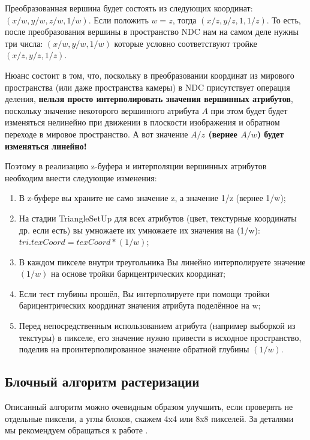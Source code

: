 \documentclass[12pt,subf,href,colorlinks=true]{article}
\begin{document}
Преобразованная вершина будет состоять из следующих координат: $(x/w, y/w, z/w, 1/w)$. Если положить $w=z$, тогда $(x/z, y/z, 1, 1/z)$. То есть, после преобразования вершины в пространство NDC нам на самом деле нужны три числа: $(x/w, y/w, 1/w)$ которые условно соответствуют тройке $(x/z, y/z, 1/z)$.

Нюанс состоит в том, что, поскольку в преобразовании координат из мирового пространства (или даже пространства камеры) в NDC присутствует операция деления, \textbf{нельзя просто интерполировать значения вершинных атрибутов}, поскольку значение некоторого вершинного атрибута $A$ при этом будет будет изменяться нелинейно при движении в плоскости изображения и обратном переходе в мировое пространство. А вот значение \textbf{$A/z$ (вернее $A/w$) будет изменяться линейно!}

Поэтому в реализацию z-буфера и интерполяции вершинных атрибутов необходим внести следующие изменения:

\begin{enumerate}
\item В z-буфере вы храните не само значение z, а значение 1/z (вернее 1/w);
\item На стадии TriangleSetUp для всех атрибутов (цвет, текстурные координаты др. если есть) вы умножаете их умножаете их значения на (1/w): \newline $tri.texCoord = texCoord*(1/w)$;
\item В каждом пикселе внутри треугольника Вы линейно интерполируете значение $(1/w)$ на основе тройки барицентрических координат;
\item Если тест глубины прошёл, Вы интерполируете при помощи тройки барицентрических координат значения атрибута поделённое на w;
\item Перед непосредственным использованием атрибута (например выборкой из текстуры) в пикселе, его значение нужно привести в исходное пространство, поделив на проинтерполированное значение обратной глубины $(1/w)$.
\end{enumerate}

\subsection{Блочный алгоритм растеризации}

Описанный алгоритм можно очевидным образом улучшить, если проверять не отдельные пиксели, а углы блоков, скажем 4x4 или 8x8 пикселей. За деталями мы рекомендуем обращаться к работе \cite{Mileff2015AcceleratedHT}.
\end{document}
